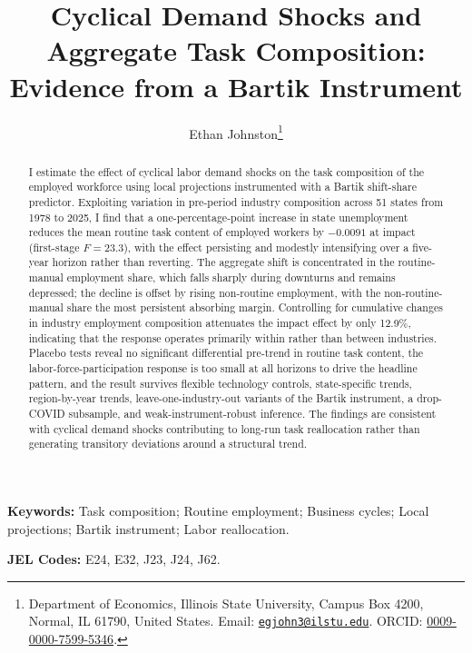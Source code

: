 \documentclass[11pt]{article}
\title{Cyclical Demand Shocks and Aggregate Task Composition:\\
       Evidence from a Bartik Instrument}
\author{Ethan Johnston\thanks{%
  Department of Economics, Illinois State University, Campus Box 4200,
  Normal, IL 61790, United States. Email: \href{mailto:egjohn3@ilstu.edu}{\texttt{egjohn3@ilstu.edu}}.
  ORCID: \href{https://orcid.org/0009-0000-7599-5346}{0009-0000-7599-5346}.}}
\date{}
\begin{document}
\maketitle
\thispagestyle{empty}

\begin{abstract}
\noindent I estimate the effect of cyclical labor demand shocks on the task composition of the employed workforce using local projections instrumented with a Bartik shift-share predictor. Exploiting variation in pre-period industry composition across 51 states from 1978 to 2025, I find that a one-percentage-point increase in state unemployment reduces the mean routine task content of employed workers by $-0.0091$ at impact (first-stage $F = 23.3$), with the effect persisting and modestly intensifying over a five-year horizon rather than reverting. The aggregate shift is concentrated in the routine-manual employment share, which falls sharply during downturns and remains depressed; the decline is offset by rising non-routine employment, with the non-routine-manual share the most persistent absorbing margin. Controlling for cumulative changes in industry employment composition attenuates the impact effect by only 12.9\%, indicating that the response operates primarily within rather than between industries. Placebo tests reveal no significant differential pre-trend in routine task content, the labor-force-participation response is too small at all horizons to drive the headline pattern, and the result survives flexible technology controls, state-specific trends, region-by-year trends, leave-one-industry-out variants of the Bartik instrument, a drop-COVID subsample, and weak-instrument-robust inference. The findings are consistent with cyclical demand shocks contributing to long-run task reallocation rather than generating transitory deviations around a structural trend.
\end{abstract}

\medskip
\noindent\textbf{Keywords:} Task composition; Routine employment; Business cycles; Local projections; Bartik instrument; Labor reallocation.

\medskip
\noindent\textbf{JEL Codes:} E24, E32, J23, J24, J62.
\end{document}
